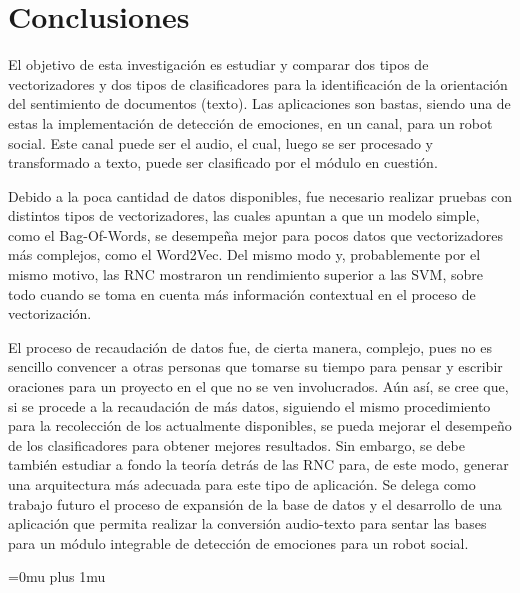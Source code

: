 \documentclass[conference]{IEEEtran}
\begin{document}




\section{Conclusiones} \label{sec:conclusiones}
    
	El objetivo de esta investigación es estudiar y comparar dos tipos de vectorizadores y dos tipos de clasificadores para la identificación de la orientación del sentimiento de documentos (texto). Las aplicaciones son bastas, siendo una de estas la implementación de detección de emociones, en un canal, para un robot social. Este canal puede ser el audio, el cual, luego se ser procesado y transformado a texto, puede ser clasificado por el módulo en cuestión.
    
    Debido a la poca cantidad de datos disponibles, fue necesario realizar pruebas con distintos tipos de vectorizadores, las cuales apuntan a que un modelo simple, como el Bag-Of-Words, se desempeña mejor para pocos datos que vectorizadores más complejos, como el Word2Vec. Del mismo modo y, probablemente por el mismo motivo, las RNC mostraron un rendimiento superior a las SVM, sobre todo cuando se toma en cuenta más información contextual en el proceso de vectorización.
    
    El proceso de recaudación de datos fue, de cierta manera, complejo, pues no es sencillo convencer a otras personas que tomarse su tiempo para pensar y escribir oraciones para un proyecto en el que no se ven involucrados. Aún así, se cree que, si se procede a la recaudación de más datos, siguiendo el mismo procedimiento para la recolección de los actualmente disponibles, se pueda mejorar el desempeño de los clasificadores para obtener mejores resultados. Sin embargo, se debe también estudiar a fondo la teoría detrás de las RNC para, de este modo, generar una arquitectura más adecuada para este tipo de aplicación. Se delega como trabajo futuro el proceso de expansión de la base de datos y el desarrollo de una aplicación que permita realizar la conversión audio-texto para sentar las bases para un módulo integrable de detección de emociones para un robot social.




\Urlmuskip=0mu plus 1mu\relax

\nocite{*}


\end{document}
